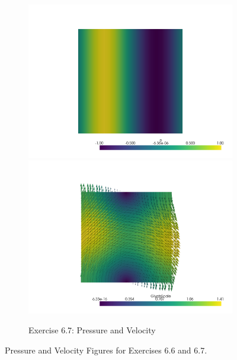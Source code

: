 \documentclass[a4paper,12pt]{article}
\theoremstyle{exerciseStyle}
\theoremstyle{solutionStyle}
\begin{document}
\begin{figure}[htbp]
\begin{subfigure}[t]{0.48\textwidth}
        \includegraphics[width=\linewidth]{figs/pressure_67.png}
        \vspace{0.5em} %
        \includegraphics[width=\linewidth]{figs/velocity_67.png}
        \caption{Exercise 6.7: Pressure and Velocity}
        \label{fig:ex67}
    \end{subfigure}
    \caption{Pressure and Velocity Figures for Exercises 6.6 and 6.7.}
    \label{fig:combined}
\end{figure}
\end{document}
